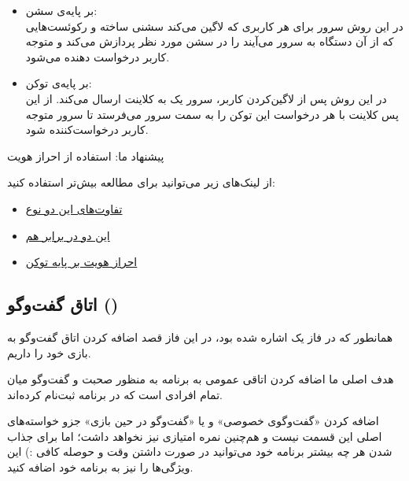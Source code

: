 \documentclass[]{article}
\begin{document}
\begin{itemize}
    \item بر پایه‌ی سشن: \\
    در این روش سرور برای هر کاربری که لاگین می‌کند سشنی ساخته و رکوئست‌هایی که از آن دستگاه به سرور می‌آیند را در سشن مورد نظر پردازش می‌کند و متوجه کاربر درخواست دهنده می‌شود.
    \item بر پایه‌ی توکن: \\
    در این روش پس از لاگین‌کردن کاربر، سرور یک  به کلاینت ارسال می‌کند. از این پس کلاینت با هر درخواست این توکن را به سمت سرور می‌فرستد تا سرور متوجه کاربر درخواست‌کننده شود.
\end{itemize}

پیشنهاد ما: استفاده از احراز هویت 

از لینک‌های زیر می‌توانید برای مطالعه بیش‌تر استفاده کنید:

\begin{itemize}
    \item \href{https://dev.to/thecodearcher/what-really-is-the-difference-between-session-and-token-based-authentication-2o39}{تفاوت‌های این دو نوع}
    \item \href{https://sherryhsu.medium.com/session-vs-token-based-authentication-11a6c5ac45e4}{این دو در برابر هم}
    \item \href{https://www.okta.com/identity-101/what-is-token-based-authentication/}{احراز هویت بر پایه توکن}
\end{itemize}

\subsection*{{\titr اتاق گفت‌وگو ()}}

همانطور که در فاز یک اشاره شده بود، در این فاز قصد اضافه کردن اتاق گفت‌وگو به بازی خود را داریم.

هدف اصلی ما اضافه کردن اتاقی عمومی به برنامه به منظور صحبت و گفت‌وگو میان تمام افرادی است که در برنامه ثبت‌نام کرده‌اند.

\begin{tcolorbox}[colback=green!5!white,colframe=green!75!black,title=\textbf{نکته}]
    اضافه کردن «گفت‌و‌گوی خصوصی» و یا «گفت‌وگو در حین بازی» جزو خواسته‌های اصلی این قسمت نیست و هم‌چنین نمره امتیازی نیز نخواهد داشت؛ اما برای جذاب شدن هر چه بیشتر برنامه خود می‌توانید در صورت داشتن وقت و حوصله کافی :) این ویژگی‌ها را نیز به برنامه خود اضافه کنید.
\end{tcolorbox}
\end{document}
